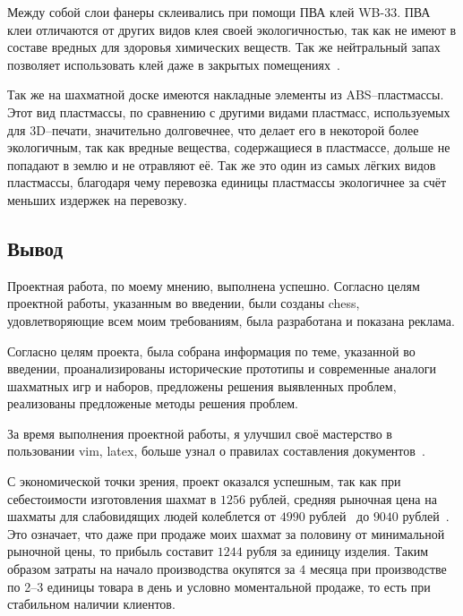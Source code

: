 Между собой слои фанеры склеивались при помощи ПВА клей WB-33. ПВА клеи
отличаются от других видов клея своей экологичностью, так как не имеют в
составе вредных для здоровья химических веществ. Так же нейтральный запах
позволяет использовать клей даже в закрытых помещениях~\cite{web:kleysnab}.

Так же на шахматной доске имеются накладные элементы из ABS--пласт\-мас\-сы. Этот
вид пластмассы, по сравнению с другими видами пластмасс, используемых для
3D--печати, значительно долговечнее, что делает его  в некоторой более
экологичным, так как вредные вещества, содержащиеся в пластмассе, дольше не
попадают в землю и не отравляют её. Так же это один из самых лёгких видов
пластмассы, благодаря чему перевозка единицы пластмассы экологичнее за счёт
меньших издержек на перевозку.

\subsection{Вывод}
Проектная работа, по моему мнению, выполнена успешно. Согласно
целям проектной работы, указанным во введении, были созданы \gls{chess},
удовлетворяющие всем моим требованиям, была разработана и показана реклама.

Согласно целям проекта, была собрана информация по теме, указанной во
введении, проанализированы исторические прототипы и современные аналоги
шахматных игр и наборов, предложены решения выявленных проблем, реализованы
предложеные методы решения проблем.

За время выполнения проектной работы, я улучшил своё мастерство в пользовании
\Gls{vim}, \gls{latex}, больше узнал о правилах составления
документов~\cite{web:docs, web:udc}.

С  экономической точки зрения, проект оказался успешным, так как при
себестоимости изготовления шахмат в $1256$ рублей, средняя рыночная цена на
шахматы для слабовидящих людей колеблется от $4990$
рублей~\cite{web:blind-chess-price-min} до $9040$
рублей~\cite{web:blind-chess-price-max}. Это означает, что даже при продаже
моих шахмат за половину от минимальной рыночной цены, то прибыль составит
$1244$ рубля за единицу изделия. Таким образом затраты на начало производства
окупятся за $4$ месяца при производстве по 2--3 единицы товара в день и условно
моментальной продаже, то есть при стабильном наличии клиентов.
